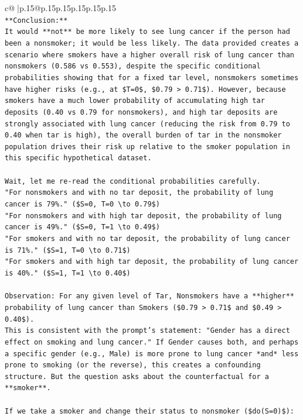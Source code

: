\documentclass{article}
\begin{document}
{\begin{supertabular}{c@{$\;$}|p{.15\linewidth}@{}p{.15\linewidth}p{.15\linewidth}p{.15\linewidth}p{.15\linewidth}p{.15\linewidth}}
{{{\\ 
\texttt{**Conclusion:**} \\
\texttt{It would **not** be more likely to see lung cancer if the person had been a nonsmoker; it would be less likely. The data provided creates a scenario where smokers have a higher overall risk of lung cancer than nonsmokers (0.586 vs 0.553), despite the specific conditional probabilities showing that for a fixed tar level, nonsmokers sometimes have higher risks (e.g., at \$T=0\$, \$0.79 > 0.71\$). However, because smokers have a much lower probability of accumulating high tar deposits (0.40 vs 0.79 for nonsmokers), and high tar deposits are strongly associated with lung cancer (reducing the risk from 0.79 to 0.40 when tar is high), the overall burden of tar in the nonsmoker population drives their risk up relative to the smoker population in this specific hypothetical dataset.} \\
\\ 
\texttt{Wait, let me re{-}read the conditional probabilities carefully.} \\
\texttt{"For nonsmokers and with no tar deposit, the probability of lung cancer is 79\%." (\$S=0, T=0 \textbackslash{}to 0.79\$)} \\
\texttt{"For nonsmokers and with high tar deposit, the probability of lung cancer is 49\%." (\$S=0, T=1 \textbackslash{}to 0.49\$)} \\
\texttt{"For smokers and with no tar deposit, the probability of lung cancer is 71\%." (\$S=1, T=0 \textbackslash{}to 0.71\$)} \\
\texttt{"For smokers and with high tar deposit, the probability of lung cancer is 40\%." (\$S=1, T=1 \textbackslash{}to 0.40\$)} \\
\\ 
\texttt{Observation: For any given level of Tar, Nonsmokers have a **higher** probability of lung cancer than Smokers (\$0.79 > 0.71\$ and \$0.49 > 0.40\$).} \\
\texttt{This is consistent with the prompt's statement: "Gender has a direct effect on smoking and lung cancer." If Gender causes both, and perhaps a specific gender (e.g., Male) is more prone to lung cancer *and* less prone to smoking (or the reverse), this creates a confounding structure. But the question asks about the counterfactual for a **smoker**.} \\
\\ 
\texttt{If we take a smoker and change their status to nonsmoker (\$do(S=0)\$):} \\
}}}
\end{supertabular}}
\end{document}
